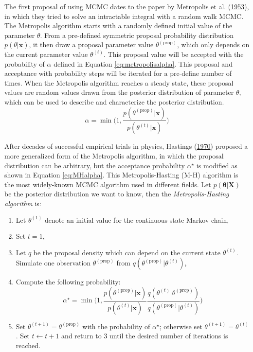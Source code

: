 \documentclass[12pt]{book}
\numberwithin{equation}{chapter}
\providecommand{\tightlist}{%
  \setlength{\itemsep}{0pt}\setlength{\parskip}{0pt}}
\begin{document}
The first proposal of using MCMC dates to the paper by Metropolis et al. (\protect\hyperlink{ref-metropolis1953equation}{1953}), in which they tried to solve an intractable integral with a random walk MCMC. The Metropolis algorithm starts with a randomly defined initial value of the parameter \(\theta\). From a pre-defined symmetric proposal probability distribution \(p(\theta | \mathbf{x})\), it then draw a proposal parameter value \(\theta^{(\text{prop})}\), which only depends on the current parameter value \(\theta^{(t)}\). This proposal value will be accepted with the probability of \(\alpha\) defined in Equation \eqref{eq:metropolisalpha}. This proposal and acceptance with probability steps will be iterated for a pre-define number of times. When the Metropolis algorithm reaches a steady state, these proposal values are random values drawn from the posterior distribution of parameter \(\theta\), which can be used to describe and characterize the posterior distribution.
\begin{equation}
\alpha = \min\bigg(1, \frac{p(\theta^{(\text{prop})}|\mathbf{x})}{p(\theta^{(t)}|\mathbf{x})}\bigg)
\label{eq:metropolisalpha}
\end{equation}

After decades of successful empirical trials in physics, Hastings (\protect\hyperlink{ref-hastings1970monte}{1970}) proposed a more generalized form of the Metropolis algorithm, in which the proposal distribution can be arbitrary, but the acceptance probability \(\alpha^\star\) is modified as shown in Equation \eqref{eq:MHalpha}. This Metropolis-Hasting (M-H) algorithm is the most widely-known MCMC algorithm used in different fields. Let \(p(\mathbf{\theta|X})\) be the posterior distribution we want to know, then the \emph{Metropolis-Hasting algorithm} is:

\begin{enumerate}
\def\labelenumi{\arabic{enumi}.}
\tightlist
\item
  Let \(\theta^{(1)}\) denote an initial value for the continuous state Markov chain,
\item
  Set \(t = 1\),
\item
  Let \(q\) be the proposal density which can depend on the current state \(\theta^{(t)}\). Simulate one observation \(\theta^{(\text{prop})}\) from \(q(\theta^{(\text{prop})} | \theta^{(t)})\),
\item
  Compute the following probability:
  \begin{equation}
    \alpha^\star = \min\bigg(1, \frac{p\left(\theta^{(\text{prop})} | \boldsymbol{x}\right)}{p\left(\theta^{(t)} | \boldsymbol{x}\right)} \frac{q\left(\theta^{(t)} | \theta^{(\text{prop})}\right)}{q\left(\theta^{(\text{prop})} | \theta^{(t)}\right)}\bigg)
    \label{eq:MHalpha}
    \end{equation}
\item
  Set \(\theta^{(t+1)} = \theta^{(\text{prop})}\) with the probability of \(\alpha^\star\); otherwise set \(\theta^{(t+1)} = \theta^{(t)}\). Set \(t \leftarrow t + 1\) and return to 3 until the desired number of iterations is reached.
\end{enumerate}
\end{document}
